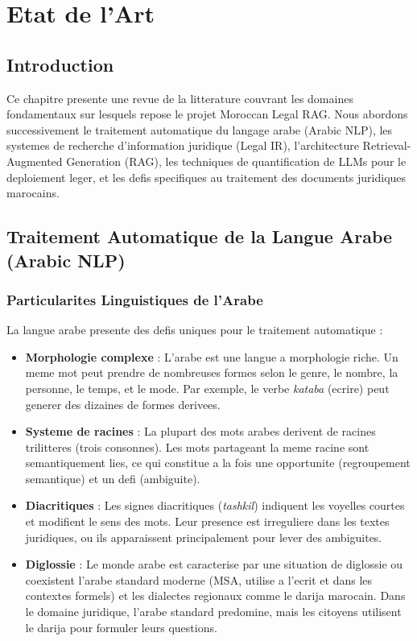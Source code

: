 \chapter{Etat de l'Art}

\section{Introduction}

Ce chapitre presente une revue de la litterature couvrant les domaines fondamentaux sur lesquels repose le projet Moroccan Legal RAG. Nous abordons successivement le traitement automatique du langage arabe (Arabic NLP), les systemes de recherche d'information juridique (Legal IR), l'architecture Retrieval-Augmented Generation (RAG), les techniques de quantification de LLMs pour le deploiement leger, et les defis specifiques au traitement des documents juridiques marocains.

\section{Traitement Automatique de la Langue Arabe (Arabic NLP)}

\subsection{Particularites Linguistiques de l'Arabe}

La langue arabe presente des defis uniques pour le traitement automatique :

\begin{itemize}
    \item \textbf{Morphologie complexe} : L'arabe est une langue a morphologie riche. Un meme mot peut prendre de nombreuses formes selon le genre, le nombre, la personne, le temps, et le mode. Par exemple, le verbe \textit{kataba} (ecrire) peut generer des dizaines de formes derivees.
    
    \item \textbf{Systeme de racines} : La plupart des mots arabes derivent de racines trilitteres (trois consonnes). Les mots partageant la meme racine sont semantiquement lies, ce qui constitue a la fois une opportunite (regroupement semantique) et un defi (ambiguite).
    
    \item \textbf{Diacritiques} : Les signes diacritiques (\textit{tashkil}) indiquent les voyelles courtes et modifient le sens des mots. Leur presence est irreguliere dans les textes juridiques, ou ils apparaissent principalement pour lever des ambiguites.
    
    \item \textbf{Diglossie} : Le monde arabe est caracterise par une situation de diglossie ou coexistent l'arabe standard moderne (MSA, utilise a l'ecrit et dans les contextes formels) et les dialectes regionaux comme le darija marocain. Dans le domaine juridique, l'arabe standard predomine, mais les citoyens utilisent le darija pour formuler leurs questions.
\end{itemize}

